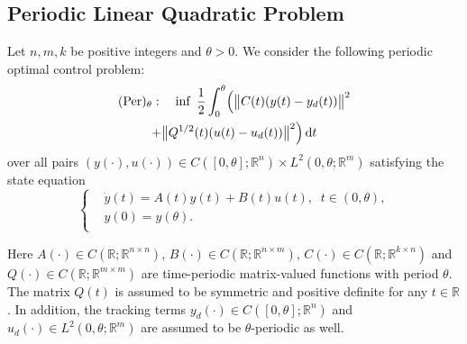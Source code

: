 \documentclass{IEEEtran}
\begin{document}
	\subsection{Periodic Linear Quadratic Problem}
	
	Let $n,m,k$ be positive integers and $\theta>0$. 
	We consider the following periodic optimal control problem:
	\begin{multline*}
		(\text{Per})_\theta:\quad
		\inf_{\vphantom{d}}\; \frac{1}{2}\int_0^\theta \Bigl( \bigl\|C(t)(y(t)-y_d(t))\bigr\|^2 \\
		+ \bigl\|Q^{1/2}(t)(u(t)-u_d(t))\bigr\|^2 \Bigr)\,\mathrm{d}t
	\end{multline*}
	over all pairs  $(y(\cdot),u(\cdot))\in C([0,\theta];\mathbb R^n)\times L^2(0,\theta;\mathbb R^m)$ satisfying the state equation
	\begin{equation*}
		\left\{
		\begin{split}
			&\dot{y}(t)=A(t)y(t)+B(t)u(t),\;\;t\in(0,\theta),\\
			&y(0)=y(\theta).\\
		\end{split}\right.
	\end{equation*}
	
	Here $A(\cdot) \in C(\mathbb R;\mathbb R^{n\times n})$, $B(\cdot)\in C(\mathbb R;\mathbb R^{n\times m})$, $C(\cdot)\in C(\mathbb R; \mathbb R^{k\times n})$ and $Q(\cdot)\in C(\mathbb R; \mathbb R^{m\times m})$ are time-periodic matrix-valued functions with period $\theta$. The matrix $Q(t)$ is assumed to be symmetric and positive definite for any $t\in\mathbb R$.
	In addition, the tracking terms $y_d(\cdot)\in C([0,\theta];\mathbb R^n)$ and $u_d(\cdot)\in L^2(0,\theta;\mathbb R^m)$ are assumed to be $\theta$-periodic as well.
	
\end{document}
